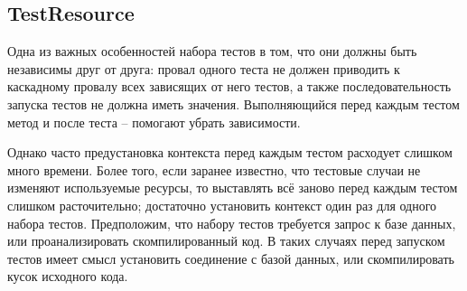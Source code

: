 \documentclass[a4paper,10pt,twoside]{book}
\begin{document}
\subsection{TestResource}

Одна из важных особенностей набора тестов в том, что они должны быть независимы друг от друга:
провал одного теста не должен приводить к каскадному провалу всех зависящих от него тестов,
а также последовательность запуска тестов не должна иметь значения.
Выполняющийся перед каждым тестом метод  и после теста –  помогают убрать зависимости.

Однако часто предустановка контекста перед каждым тестом расходует слишком много времени.
Более того, если заранее известно, что тестовые случаи не изменяют используемые ресурсы,
то выставлять всё заново перед каждым тестом слишком расточительно;
достаточно установить контекст один раз для одного набора тестов.
Предположим, что набору тестов требуется запрос к базе данных,
или проанализировать скомпилированный код.
В таких случаях перед запуском тестов имеет смысл установить соединение с базой данных,
или скомпилировать кусок исходного кода.
\end{document}
